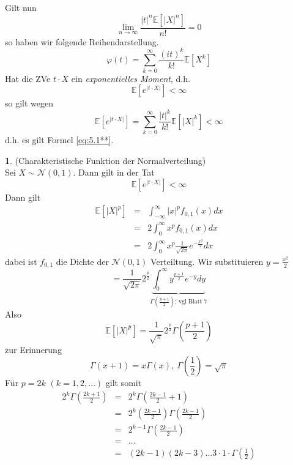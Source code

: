 \documentclass[10pt,a4paper]{report}
\numberwithin{equation}{section}
\numberwithin{figure}{section}
\theoremstyle{plain}
\theoremstyle{definition}
\newtheorem{example}[thm]{\protect\examplename}
\theoremstyle{remark}
\theoremstyle{plain}
\providecommand{\examplename}{Beispiel}
\newcommand{\1}{ \mathbb{1} } %
\begin{document}
Gilt nun 
\[
\lim_{n\to\infty}\frac{\left|t\right|^{n}\mathbb{E}\left[\left|X\right|^{n}\right]}{n!}=0
\]
so haben wir folgende Reihendarstellung. 
\begin{equation}
\varphi\left(t\right)=\sum_{k=0}^{\infty}\frac{\left(it\right)^{k}}{k!}\mathbb{E}\left[X^{k}\right]\label{eq:5.1**}
\end{equation}
Hat die ZVe $t\cdot X$ ein \emph{exponentielles
Moment}, d.h. 
\[
\mathbb{E}\left[e^{\left|t\cdot X\right|}\right]<\infty
\]
so gilt wegen 
\[
\mathbb{E}\left[e^{\left|t\cdot X\right|}\right]=\sum_{k=0}^{\infty}\frac{\left|t\right|^{k}}{k!}\mathbb{E}\left[\left|X\right|^{k}\right]<\infty
\]
d.h. es gilt Formel \ref{eq:5.1**}. 
\begin{example}
(Charakteristische Funktion der Normalverteilung)\\
Sei $X\sim\mathcal{N}\left(0,1\right)$. Dann gilt in der Tat
\[
\mathbb{E}\left[e^{\left|t\cdot X\right|}\right]<\infty
\]
Dann gilt 
\begin{eqnarray*}
\mathbb{E}\left[\left|X\right|^{p}\right] & = & \int_{-\infty}^{\infty}\left|x\right|^{p}f_{0,1}\left(x\right)dx\\
 & = & 2\int_{0}^{\infty}x^{p}f_{0,1}\left(x\right)dx\\
 & = & 2\int_{0}^{\infty}x^{p}\frac{1}{\sqrt{2\pi}}e^{-\frac{x^{2}}{2}}dx
\end{eqnarray*}
dabei ist $f_{0,1}$ die Dichte der $\mathcal{N}\left(0,1\right)$
Verteiltung. Wir substituieren $y=\frac{x^{2}}{2}$
\[
=\frac{1}{\sqrt{2\pi}}2^{\frac{p}{2}}\underset{\Gamma\left(\frac{p+1}{2}\right)\mbox{; vgl Blatt 7}}{\underbrace{\int_{0}^{\infty}y^{\frac{p+1}{2}}e^{-y}dy}}
\]
Also 
\[
\mathbb{E}\left[\left|X\right|^{p}\right]=\frac{1}{\sqrt{\pi}}2^{\frac{p}{2}}\Gamma\left(\frac{p+1}{2}\right)
\]
zur Erinnerung
\[
\Gamma\left(x+1\right)=x\Gamma\left(x\right),\ \Gamma\left(\frac{1}{2}\right)=\sqrt{\pi}
\]
Für $p=2k$ $\left(k=1,2,\ldots\right)$ gilt somit 
\begin{eqnarray*}
2^{k}\Gamma\left(\frac{2k+1}{2}\right) & = & 2^{k}\Gamma\left(\frac{2k-1}{2}+1\right)\\
 & = & 2^{k}\left(\frac{2k-1}{2}\right)\Gamma\left(\frac{2k-1}{2}\right)\\
 & = & 2^{k-1}\Gamma\left(\frac{2k-1}{2}\right)\\
 & = & \ldots\\
 & = & \left(2k-1\right)\left(2k-3\right)\ldots3\cdot1\cdot\Gamma\left(\frac{1}{2}\right)
\end{eqnarray*}

\end{example}
\end{document}
